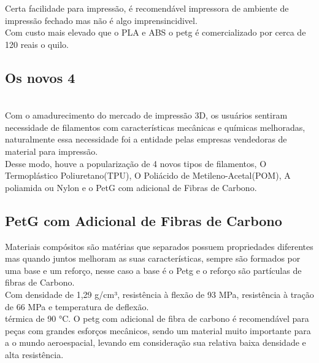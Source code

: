 Certa facilidade para impressão, é recomendável impressora de ambiente de impressão fechado mas não é algo imprensincidivel.\\[0.2cm]



Com custo mais elevado que o PLA e ABS o petg é comercializado por cerca de 120 reais o quilo. \\[0.2cm]



\subsection{Os novos 4} \\[0.2cm]



Com o amadurecimento do mercado de impressão 3D, os usuários sentiram necessidade de filamentos com características mecânicas e químicas melhoradas, naturalmente essa necessidade foi a entidade pelas empresas vendedoras de material para impressão.\\[0.2cm]

Desse modo, houve a popularização de 4 novos tipos de filamentos, O Termoplástico Poliuretano(TPU), O Poliácido de Metileno-Acetal(POM), A poliamida ou Nylon e o PetG com adicional de Fibras de Carbono.\\[0.2cm]





\subsection{PetG com Adicional de Fibras de Carbono}

Materiais compósitos são matérias que separados possuem propriedades diferentes mas quando juntos melhoram as suas características, sempre são formados por uma base e um reforço, nesse caso a base é o Petg e o reforço são partículas de fibras de Carbono.\\[0.2cm]



Com densidade de 1,29 g/cm³, resistência à flexão de 93 MPa, resistência à tração de 66 MPa e temperatura de deflexão.\\[0.2cm]

térmica de 90 °C. O petg com adicional de fibra de carbono é recomendável para peças com grandes esforços mecânicos, sendo um material muito importante para a o mundo aeroespacial, levando em consideração sua relativa baixa densidade e alta resistência.\\[0.2cm]



